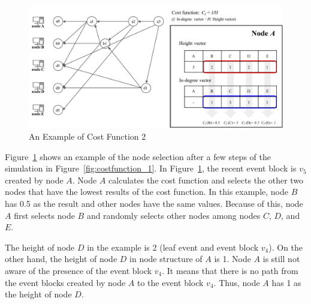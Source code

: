 \documentclass{article}
\begin{document}
\begin{figure}[h] \centering  
\includegraphics[width=.8\textwidth]{costfunction_2.pdf}
\caption{An Example of Cost Function 2}
\label{fig:costfunction_2}
\end{figure}

Figure~\ref{fig:costfunction_2} shows an example of the node selection after a few steps of the simulation in Figure~\ref{fig:costfunction_1}. In Figure~\ref{fig:costfunction_2}, the recent event block is $v_5$ created by node $A$. Node $A$ calculates the cost function and selects the other two nodes that have the lowest results of the cost function. In this example, node $B$ has 0.5 as the result and other nodes have the same values. Because of this, node $A$ first selects node $B$ and randomly selects other nodes among nodes $C$, $D$, and $E$.

The height of node $D$ in the example is 2 (leaf event and event block $v_4$). On the other hand, the height of node $D$ in node structure of $A$ is 1. Node $A$ is still not aware of the presence of the event block $v_4$. It means that there is no path from the event blocks created by node $A$ to the event block $v_4$. Thus, node $A$ has 1 as the height of node $D$. 
\end{document}
